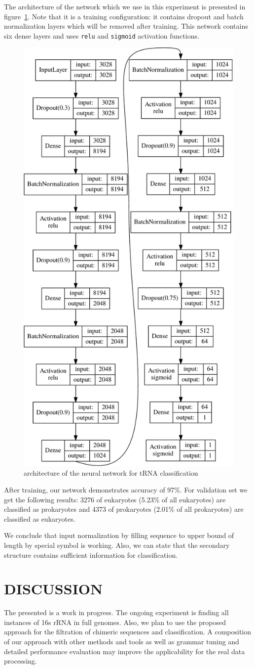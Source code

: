 \documentclass[a4paper,twoside]{article}
\begin{document}
The architecture of the network which we use in this experiment is presented in figure~\ref{fig:nn}.
Note that it is a training configuration: it contains dropout and batch normalization layers which will be removed after training.
This network contains six dense layers and uses \verb|relu| and \verb|sigmoid| activation functions.

\begin{figure}
\centering
\includegraphics[width=.4\textwidth]{figures/model-crop.pdf}
\caption{architecture of the neural network for tRNA classification}
\label{fig:nn}
\end{figure}

After training, our network demonstrates accuracy of 97\%. 
For validation set we get the following results: 3276 of eukaryotes (5.23\% of all eukaryotes) are classified as prokaryotes and 4373 of prokaryotes (2.01\% of all prokaryotes) are classified as eukaryotes. 

We conclude that input normalization by filling sequence to upper bound of length by special symbol is working.
Also, we can state that the secondary structure contains sufficient information for classification.


\section{\uppercase{Discussion}}
\label{sec:Discussion}

\noindent The presented is a work in progress. 
The ongoing experiment is finding all instances of 16s rRNA in full genomes.
Also, we plan to use the proposed approach for the filtration of chimeric sequences and classification.
A composition of our approach with other methods and tools as well as grammar tuning and detailed performance evaluation may improve the applicability for the real data processing.
\end{document}
